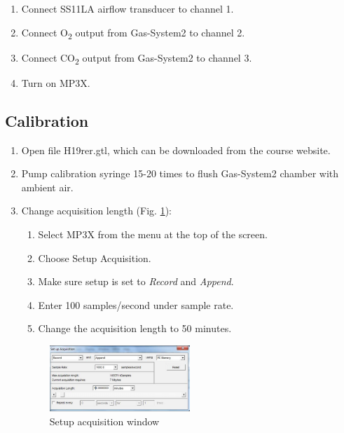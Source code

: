 \documentclass{article}
\begin{document}
\begin{enumerate}
	\item Connect SS11LA airflow transducer to channel 1.
	\item Connect O\textsubscript{2} output from Gas-System2 to channel 2.
	\item Connect CO\textsubscript{2} output from Gas-System2 to channel 3.
	\item Turn on MP3X.
\end{enumerate}

\subsection*{Calibration}
\begin{enumerate}
	\item Open file H19rer.gtl, which can be downloaded from the course website.
	\item Pump calibration syringe 15-20 times to flush Gas-System2 chamber with ambient air.
	\item Change acquisition length (Fig. \ref{acqlength}):\begin{enumerate}
	\item Select MP3X from the menu at the top of the screen.
	\item Choose Setup Acquisition.
	\item Make sure setup is set to \textit{Record} and \textit{Append}.
	\item Enter 100 samples/second under sample rate.
	\item Change the acquisition length to 50 minutes.
	\end{enumerate}
	
	\begin{figure}[h]
	\centering\includegraphics[width=0.5\textwidth]{../images/BMR_4.jpg}
		\caption{Setup acquisition window}
		\label{acqlength}
		\end{figure}
		

\end{enumerate}
\end{document}
